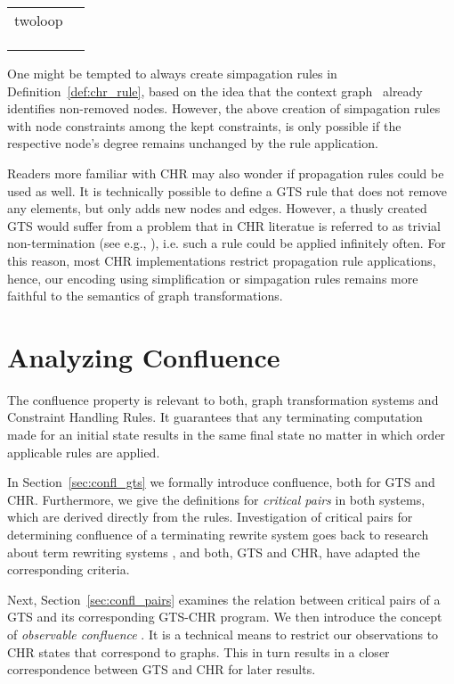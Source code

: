 \documentclass{tlp}
\begin{document}
\begin{center} 
\begin{tabular}{ll} 
twoloop  & \\
& \\
& \\
& 
\end{tabular}
\end{center}

One might be tempted to always create simpagation rules in
Definition~\ref{def:chr_rule}, based on the idea that the context graph~
already identifies non-removed nodes. However, the above creation of simpagation
rules with node constraints among the kept constraints, is only possible if the
respective node's degree remains unchanged by the rule application.

Readers more familiar with CHR may also wonder if propagation rules could be used
as well. It is technically possible to define a GTS rule that does not remove any
elements, but only adds new nodes and edges. However, a thusly created GTS would
suffer from a problem that in CHR literatue is referred to as trivial
non-termination (see e.g., \cite{fruehwirth09}), i.e. such a rule could be
applied infinitely often. For this reason, most CHR implementations restrict
propagation rule applications, hence, our encoding using simplification or
simpagation rules remains more faithful to the semantics of graph
transformations.

\section{Analyzing Confluence}
\label{sec:confluence}

The confluence property is relevant to both, graph transformation systems and
Constraint Handling Rules. It guarantees that any terminating computation made
for an initial state results in the same final state no matter in which order
applicable rules are applied.

In Section~\ref{sec:confl_gts} we formally introduce confluence, both for GTS and
CHR. Furthermore, we give the definitions for \emph{critical pairs} in both
systems, which are derived directly from the rules. Investigation of critical
pairs for determining confluence of a terminating rewrite system goes back to
research about term rewriting systems \cite{huet80}, and both, GTS and CHR, have
adapted the corresponding criteria.

Next, Section~\ref{sec:confl_pairs} examines the relation between critical pairs
of a GTS and its corresponding GTS-CHR program. We then introduce the concept of
\emph{observable confluence} \cite{duckstuckeysulzmann07}. It is a technical
means to restrict our observations to CHR states that correspond to graphs. This
in turn results in a closer correspondence between GTS and CHR for later results.
\end{document}
